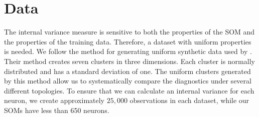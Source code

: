 \section{Data}
\label{meth:data}
The internal variance measure is sensitive to both the properties of the SOM
and the properties of the training data. Therefore, a dataset with uniform
properties is needed. We follow the method for generating uniform synthetic
data used by \cite{wu2006}.  
Their method creates seven clusters in three dimensions.
Each cluster is normally distributed and has a standard deviation
of one.  The uniform clusters generated by this method allow us to
systematically compare the diagnostics under several different topologies.  To
ensure that we can calculate an internal variance for each neuron, we create
approximately $25,000$ observations in each dataset, while our SOMs have less
than 650 neurons.







